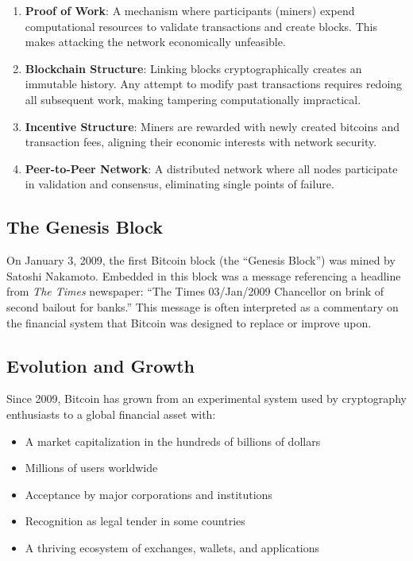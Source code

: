 \begin{enumerate}
  \item \textbf{Proof of Work}: A mechanism where participants (miners) expend computational resources to validate transactions and create blocks. This makes attacking the network economically unfeasible.

  \item \textbf{Blockchain Structure}: Linking blocks cryptographically creates an immutable history. Any attempt to modify past transactions requires redoing all subsequent work, making tampering computationally impractical.

  \item \textbf{Incentive Structure}: Miners are rewarded with newly created bitcoins and transaction fees, aligning their economic interests with network security.

  \item \textbf{Peer-to-Peer Network}: A distributed network where all nodes participate in validation and consensus, eliminating single points of failure.
\end{enumerate}

\subsection{The Genesis Block}
\label{subsec:genesis-block}

On January 3, 2009, the first Bitcoin block (the ``Genesis Block'') was mined by Satoshi Nakamoto. Embedded in this block was a message referencing a headline from \emph{The Times} newspaper: ``The Times 03/Jan/2009 Chancellor on brink of second bailout for banks.'' This message is often interpreted as a commentary on the financial system that Bitcoin was designed to replace or improve upon.

\subsection{Evolution and Growth}
\label{subsec:evolution-growth}

Since 2009, Bitcoin has grown from an experimental system used by cryptography enthusiasts to a global financial asset with:
\begin{itemize}
  \item A market capitalization in the hundreds of billions of dollars
  \item Millions of users worldwide
  \item Acceptance by major corporations and institutions
  \item Recognition as legal tender in some countries
  \item A thriving ecosystem of exchanges, wallets, and applications
\end{itemize}

